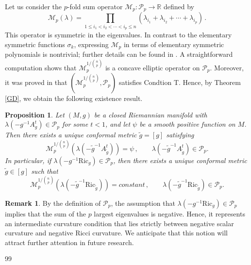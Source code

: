 \documentclass{article}
\theoremstyle{plain}
\newtheorem{proposition}[theorem]{Proposition}
\theoremstyle{definition}
\newtheorem{remark}[theorem]{Remark}
\theoremstyle{definition}
\numberwithin{equation}{section}
\begin{document}
\begin{sloppypar}
Let us consider the $p$-fold sum operator $\mathcal{M}_{p}:\mathcal{P}_{p}\rightarrow \mathbb{R}$ defined by
\begin{equation}
\mathcal{M}_{p}(\lambda) = \prod_{1 \leq i_1 < i_2 < \cdots < i_{p} \leq n} (\lambda_{i_1} + \lambda_{i_2} + \cdots + \lambda_{i_p}) \,.
\end{equation}
This operator is symmetric in the eigenvalues. In contrast to the elementary symmetric functions $\sigma_k$,
expressing $\mathcal{M}_p$ in terms of elementary symmetric polynomials is nontrivial; further details can be found in \cite{D21}. A straightforward computation shows that 
$\mathcal{M}^{1/\binom{n}{p}}_{p}$ is a concave elliptic operator on $\mathcal{P}_{p}$. Moreover,  it was proved in \cite{ZZ25} that $(\mathcal{M}^{1/\binom{n}{p}}_{p},\mathcal{P}_{p})$ satisfies Condtion T. Hence, by Theorem \ref{GD}, we obtain the following existence result.
\begin{proposition}\label{p curvature problem}
Let $(M,g)$ be a closed Riemannian manifold with $\lambda(-g^{-1}A_{g}^{t})\in \mathcal{P}_{p}$ for some $t<1$, and let $\psi$ be a smooth positive function on $M$. Then there exists a unique conformal metric $\tilde{g}=[g]$ satisfying
\begin{equation}
\mathcal{M}^{1/\binom{n}{p}}_{p}(\lambda(-\tilde{g}^{-1}A_{\tilde{g}}^{t}))=\psi\,, \qquad \lambda(-\tilde{g}^{-1}A_{\tilde{g}}^{t})\in \mathcal{P}_{p}.
\end{equation}
In particular, if $\lambda(-g^{-1}\mathrm{Ric}_{g})\in \mathcal{P}_{p}$, then there exists a unique conformal metric $\tilde{g}\in [g]$ such that 
\[
\mathcal{M}^{1/\binom{n}{p}}_{p}(\lambda(-\tilde{g}^{-1}\mathrm{Ric}_{\tilde{g}})) =constant\,, \qquad \lambda(-\tilde{g}^{-1}\mathrm{Ric}_{\tilde{g}})\in \mathcal{P}_{p}. 
\]
\end{proposition}

\begin{remark}
By the definition of $\mathcal{P}_{p}$, the assumption that $\lambda(-g^{-1}\mathrm{Ric}_{g}) \in \mathcal{P}_{p}$ implies that the sum of the $p$ largest eigenvalues is negative. Hence, it represents an intermediate curvature condition that lies strictly between negative scalar curvature and negative Ricci curvature. We anticipate that this notion will attract further attention in future research.
\end{remark}





\begin{thebibliography}{99}




\end{thebibliography}
\end{sloppypar}
\end{document}
